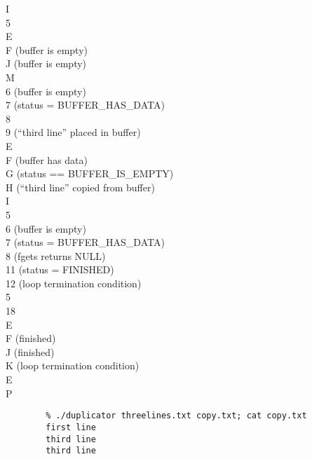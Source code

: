 {\begin{multicols}{2}
        \phantom{foobarbaz} I \\
        5 \\
        \phantom{foobarbaz} E \\
        \phantom{foobarbaz} F   (buffer is empty) \\
        \phantom{foobarbaz} J   (buffer is empty) \\
        \phantom{foobarbaz} M \\
        6   (buffer is empty) \\
        7   (status = BUFFER\_HAS\_DATA) \\
        8 \\
        9   (``third line'' placed in buffer) \\
        \phantom{foobarbaz} E \\
        \phantom{foobarbaz} F   (buffer has data) \\
        \phantom{foobarbaz} G   (status == BUFFER\_IS\_EMPTY) \\
        \phantom{foobarbaz} H   (``third line'' copied from buffer) \\
        \phantom{foobarbaz} I \\
        5 \\
        6   (buffer is empty) \\
        7   (status = BUFFER\_HAS\_DATA) \\
        8   (fgets returns NULL) \\
        11  (status = FINISHED) \\
        12  (loop termination condition) \\
        5 \\
        18 \\
        \phantom{foobarbaz} E \\
        \phantom{foobarbaz} F   (finished) \\
        \phantom{foobarbaz} J   (finished) \\
        \phantom{foobarbaz} K   (loop termination condition) \\
        \phantom{foobarbaz} E \\
        \phantom{foobarbaz} P
    \end{multicols}}

    \begin{description}
    \end{description}
    \begin{verbatim}
        % ./duplicator threelines.txt copy.txt; cat copy.txt
        first line
        third line
        third line
    \end{verbatim}

